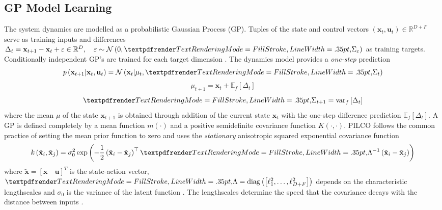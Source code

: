 \subsection{GP Model Learning}
\label{PILCO:GP-model-learning}
The system dynamics are modelled as a probabilistic Gaussian Process (GP). Tuples of the state and control vectors $\left(\mathbf{x}_{t}, \mathbf{u}_{t}\right)\in \mathbb{R}^{D+F}$ serve as training inputs and differences $\Delta_{t}=\mathbf{x}_{t+1}-\mathbf{x}_{t}+\varepsilon \in \mathbb{R}^{D},\quad \varepsilon \sim \mathcal{N}\left(0, \boldgreek{\Sigma}_{\varepsilon}\right)$ as training targets. Conditionally independent GP's are trained for each target dimension \citep{deisenroth2010efficient}. The dynamics model provides a \textit{one-step} prediction \citep{deisenroth2011pilco}
\begin{equation}
    p\left(\mathbf{x}_{t+1} | \mathbf{x}_{t}, \mathbf{u}_{t}\right)=\mathcal{N}\left(\mathbf{x}_{t} | \mu_{t}, \boldgreek{\Sigma}_{t}\right)
    \label{Eq:PILCO-one-step-1}
\end{equation}
\begin{equation}
    \mu_{t+1}=\mathbf{x}_{t}+\mathbb{E}_{f}\left[\Delta_{t}\right]
    \label{Eq:PILCO-one-step-2}
\end{equation}
\begin{equation}
    \boldgreek{\Sigma}_{t+1}=\operatorname{var}_{f}\left[\Delta_{t}\right]
    \label{Eq:PILCO-one-step-3}
\end{equation}
where the mean $\mu$ of the state $\mathbf{x}_{t+1}$ is obtained through addition of the current state $\mathbf{x}_{t}$ with the one-step difference prediction $\mathbb{E}_{f}\left[\Delta_{t}\right]$. A GP is defined completely by a mean function $m(\cdot)$ and a positive semidefinite covariance function $K(\cdot,\cdot)$. PILCO follows the common practice of setting the mean prior function to zero and uses the \textit{stationary} anisotropic squared exponential covariance function
\begin{equation}
    k\left(\tilde{\mathbf{x}}_{i}, \tilde{\mathbf{x}}_{j}\right)=\sigma_{0}^{2} \exp \left(-\frac{1}{2}\left(\tilde{\mathbf{x}}_{i}-\tilde{\mathbf{x}}_{j}\right)^{\top} \boldgreek{\Lambda}^{-1}\left(\tilde{\mathbf{x}}_{i}-\tilde{\mathbf{x}}_{j}\right)\right)
    \label{Eq:PILCO-sq-exponential-covariance}
\end{equation}
where $\tilde{\mathbf{x}} = \left[\mathbf{x}\quad\mathbf{u}\right]^{T}$ is the state-action vector, $\boldgreek{\Lambda} =\operatorname{diag}\left(\left[\ell_{1}^{2}, \ldots, \ell_{D+F}^{2}\right]\right)$ depends on the characteristic lengthscales and $\sigma_{0}$ is the variance of the latent function \citep{deisenroth2013gaussian}. The lengthscales determine the speed that the covariance decays with the distance between inputs \citep{quia2010sparse}.

